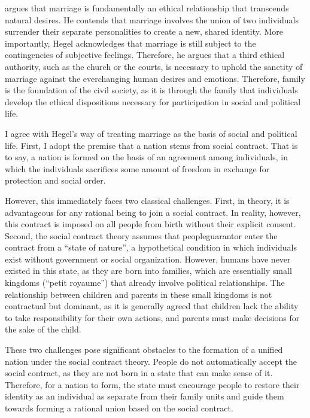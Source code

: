 \documentclass{article}
\begin{document}
\textcite{hegelPhilosophyRight1821a} argues that marriage is fundamentally an ethical relationship that transcends natural desires. He contends that marriage involves the union of two individuals surrender their separate personalities to create a new, shared identity. More importantly, Hegel acknowledges that marriage is still subject to the contingencies of subjective feelings. Therefore, he argues that a third ethical authority, such as the church or the courts, is necessary to uphold the sanctity of marriage against the everchanging human desires and emotions. Therefore, family is the foundation of the civil society, as it is through the family that individuals develop the ethical dispositions necessary for participation in social and political life.

I agree with Hegel's way of treating marriage as the basis of social and political life. First, I adopt the premise that a nation stems from social contract. That is to say, a nation is formed on the basis of an agreement among individuals, in which the individuals sacrifices some amount of freedom in exchange for protection and social order. 

However, this immediately faces two classical challenges. First, in theory, it is advantageous for any rational being to join a social contract. In reality, however, this contract is imposed on all people from birth without their explicit consent. Second, the social contract theory assumes that peopleguarantor enter the contract from a ``state of nature'', a hypothetical condition in which individuals exist without government or social organization. However, humans have never existed in this state, as they are born into families, which are essentially small kingdoms (``petit royaume'') that already involve political relationships. The relationship between children and parents in these small kingdoms is not contractual but dominant, as it is generally agreed that children lack the ability to take responsibility for their own actions, and parents must make decisions for the sake of the child.

These two challenges pose significant obstacles to the formation of a unified nation under the social contract theory. People do not automatically accept the social contract, as they are not born in a state that can make sense of it. Therefore, for a nation to form, the state must encourage people to restore their identity as an individual as separate from their family units and guide them towards forming a rational union based on the social contract. 
\end{document}
